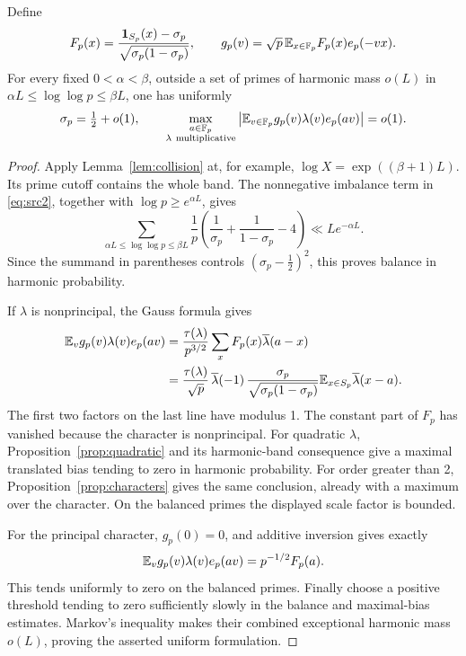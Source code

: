 \begin{corollary}\label{cor:mixed-flatness}
Define
\[
 F_p(x)=\frac{\mathbf 1_{S_p}(x)-\sigma_p}
                {\sqrt{\sigma_p(1-\sigma_p)}},
 \qquad
 g_p(v)=\sqrt p\,\mathbb E_{x\in\mathbb F_p}F_p(x)e_p(-vx).
\]
For every fixed \(0<\alpha<\beta\), outside a set of primes
of harmonic mass \(o(L)\) in
\(\alpha L\le\log\log p\le\beta L\), one has uniformly
\begin{equation}\label{eq:src27}
 \sigma_p=\tfrac12+o(1),\qquad
 \max_{\substack{a\in\mathbb F_p\\\lambda\ {\rm multiplicative}}}
 \left|\mathbb E_{v\in\mathbb F_p}g_p(v)\lambda(v)e_p(av)\right|=o(1).
\end{equation}
\end{corollary}

\begin{proof}
Apply Lemma~\ref{lem:collision} at, for example,
\(\log X=\exp((\beta+1)L)\). Its prime cutoff contains
the whole band. The nonnegative imbalance term in
\eqref{eq:src2}, together with
\(\log p\ge e^{\alpha L}\), gives
\[
 \sum_{\alpha L\le\log\log p\le\beta L}\frac1p
 \left(\frac1{\sigma_p}+\frac1{1-\sigma_p}-4\right)
 \ll Le^{-\alpha L}.
\]
Since the summand in parentheses controls
\((\sigma_p-\tfrac12)^2\), this proves balance in harmonic
probability.

If \(\lambda\) is nonprincipal, the Gauss formula gives
\begin{align*}
 \mathbb E_v g_p(v)\lambda(v)e_p(av)
 &=\frac{\tau(\lambda)}{p^{3/2}}
           \sum_xF_p(x)\overline{\lambda}(a-x)\\
 &=\frac{\tau(\lambda)}{\sqrt p}\,
     \overline{\lambda}(-1)\,
     \frac{\sigma_p}{\sqrt{\sigma_p(1-\sigma_p)}}
        \mathbb E_{x\in S_p}\overline{\lambda}(x-a).
\end{align*}
The first two factors on the last line have modulus 1.
The constant part of \(F_p\) has vanished because the
character is nonprincipal. For quadratic \(\lambda\),
Proposition~\ref{prop:quadratic} and its harmonic-band
consequence give a maximal translated bias tending to
zero in harmonic probability. For order greater than 2,
Proposition~\ref{prop:characters} gives the same conclusion,
already with a maximum over the character.
On the balanced primes the displayed scale factor is
bounded.

For the principal character, \(g_p(0)=0\), and additive
inversion gives exactly
\[
 \mathbb E_v g_p(v)\lambda(v)e_p(av)=p^{-1/2}F_p(a).
\]
This tends uniformly to zero on the balanced primes.
Finally choose a positive threshold tending to zero
sufficiently slowly in the balance and maximal-bias
estimates. Markov's inequality makes their combined
exceptional harmonic mass \(o(L)\), proving the asserted
uniform formulation.
\end{proof}
